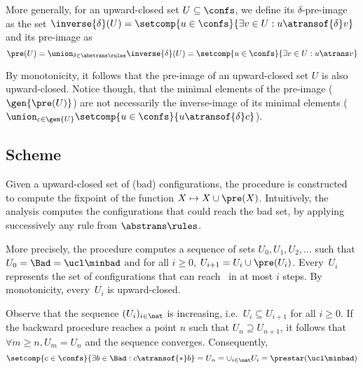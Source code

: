 More generally, for an upward-closed set $U\subseteq\confs$, we define
its $\delta$-pre-image as the set
$\inverse{\delta}(U)=\setcomp{u\in\confs}{\exists v\in U :
  u\atransof{\delta}v}$ and its pre-image as
$$\pre(U) = \union_{\delta\in\abstrans\rules}\inverse{\delta} (U)=\setcomp{u\in\confs}{\exists v\in U : u\atrans v}$$

By monotonicity, it follows that the pre-image of an upward-closed set
$U$ is also upward-closed. Notice though, that the minimal elements of
the pre-image ($\gen{\pre(U)}$) are not necessarily the inverse-image
of its minimal elements
($\union_{c\in\gen{U}}\setcomp{u\in\confs}{u\atransof{\delta}c}$).

\subsection*{Scheme}
Given a upward-closed set of (bad) configurations, the procedure is
constructed to compute the fixpoint of the function $X\mapsto
X\cup\pre(X)$. %
%
Intuitively, the analysis computes the configurations that could reach
the bad set, by applying successively any rule from
$\abstrans\rules$. %

More precisely, the procedure computes a sequence of sets $U_0, U_1,
U_2, \ldots$ such that $U_0=\Bad=\ucl\minbad$ and for all $i\geq 0$,
$U_{i+1}= U_i \cup \pre(U_i)$. %
Every~$U_i$ represents the set of configurations that can reach \Bad\
in at most $i$ steps. By monotonicity, every~$U_i$ is upward-closed.

Observe that the sequence $(U_i)_{i\in\nat}$ is increasing, i.e.\ $U_i
\subseteq U_{i+1}$ for all $i\geq 0$. %
If the backward procedure reaches a point $n$ such that $U_n\supseteq
U_{n+1}$, it follows that $\forall m\ge n, U_m = U_n$ and the sequence
converges.
%
Consequently, %
$$\setcomp{c\in\confs}{\exists b\in \Bad :c\atransof{*} b}=U_n=\cup_{i\in\nat}U_i=\prestar(\ucl\minbad)$$

